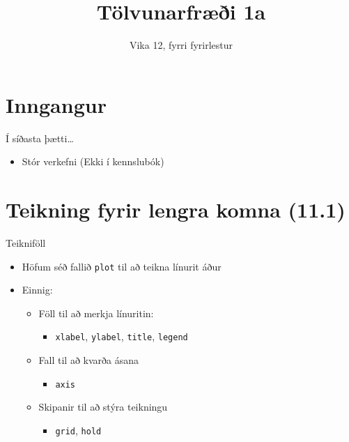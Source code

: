 \documentclass{beamer}
\title{Tölvunarfræði 1a}
\subtitle{Vika 12, fyrri fyrirlestur}
\begin{document}
\begin{frame}
\titlepage
\end{frame}

\section{Inngangur}

\begin{frame}{Í síðasta þætti\ldots}
\begin{itemize}
 \item Stór verkefni (Ekki í kennslubók)
\end{itemize}
\end{frame}

\section{Teikning fyrir lengra komna (11.1)}

\begin{frame}{Teikniföll}
\begin{itemize}
 \item Höfum séð fallið \texttt{plot} til að teikna línurit áður
 \item Einnig:
 \begin{itemize}
  \item Föll til að merkja línuritin:
  \begin{itemize}
   \item \texttt{xlabel}, \texttt{ylabel}, \texttt{title}, \texttt{legend}
  \end{itemize}
  \item Fall til að kvarða ásana
  \begin{itemize}
   \item \texttt{axis}
  \end{itemize}
  \item Skipanir til að stýra teikningu
  \begin{itemize}
   \item \texttt{grid}, \texttt{hold}
  \end{itemize}
 \end{itemize}
\end{itemize}
\end{frame}
\end{document}
